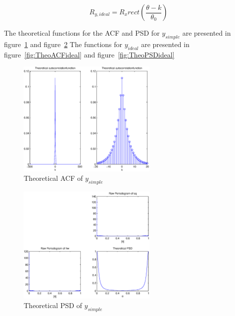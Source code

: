 \documentclass[10pt]{article}
\begin{document}
\begin{equation}
  \label{eq:PSDideal}
  R_{y,ideal} = R_xrect(\frac{\theta - k}{\theta_0})
\end{equation}


The theoretical functions for the ACF and PSD for $y_{simple}$ are presented
in figure~\ref{fig:TheoACFsimple} and figure~\ref{fig:TheoPSDsimple}
The functions for $y_{ideal}$ are presented in figure~\ref{fig:TheoACFideal} and
figure~\ref{fig:TheoPSDideal}



\begin{figure}[!hp]

    \begin{center}
      \includegraphics[width=0.6\textwidth]{TheoACF}
    \caption{Theoretical ACF of $y_{simple}$ \label{fig:TheoACFsimple}}
    \end{center}

\end{figure}

\begin{figure}[!hp]

    \begin{center}
      \includegraphics[width=0.6\textwidth]{TheoPSD}
    \caption{Theoretical PSD of $y_{simple}$ \label{fig:TheoPSDsimple}}
    \end{center}

\end{figure}
\end{document}
